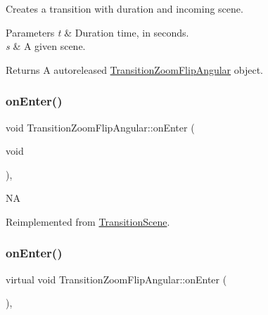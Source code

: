 Creates a transition with duration and incoming scene.


\begin{DoxyParams}{Parameters}
{\em t} & Duration time, in seconds. \\
\hline
{\em s} & A given scene. \\
\hline
\end{DoxyParams}
\begin{DoxyReturn}{Returns}
A autoreleased \hyperlink{classTransitionZoomFlipAngular}{Transition\+Zoom\+Flip\+Angular} object. 
\end{DoxyReturn}
\mbox{\label{classTransitionZoomFlipAngular_aabb32c716e6bcc7d75b1ac65e2b4d577}} 
\subsubsection{\texorpdfstring{on\+Enter()}{onEnter()}\hspace{0.1cm}{\footnotesize\ttfamily [1/2]}}
{\footnotesize\ttfamily void Transition\+Zoom\+Flip\+Angular\+::on\+Enter (\begin{DoxyParamCaption}\item[{void}]{ }\end{DoxyParamCaption})\hspace{0.3cm}{\ttfamily [override]}, {\ttfamily [virtual]}}

NA 

Reimplemented from \hyperlink{classTransitionScene_aace390a1bd8f3c73bb650a1e256a0f83}{Transition\+Scene}.

\mbox{\label{classTransitionZoomFlipAngular_aacb744aa3be41964b84c4413472cb456}} 
\subsubsection{\texorpdfstring{on\+Enter()}{onEnter()}\hspace{0.1cm}{\footnotesize\ttfamily [2/2]}}
{\footnotesize\ttfamily virtual void Transition\+Zoom\+Flip\+Angular\+::on\+Enter (\begin{DoxyParamCaption}{ }\end{DoxyParamCaption})\hspace{0.3cm}{\ttfamily [override]}, {\ttfamily [virtual]}}

